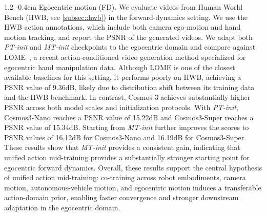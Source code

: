 \documentclass{llmxive}
\makeatletter
\providecommand{\paragraph}{  \@startsection{paragraph}{4}{\z@}    {1\baselineskip \@plus .2\baselineskip}    {-0.4em}    {\normalfont\normalsize\bfseries}}
\makeatother
\begin{document}
\paragraph{Egocentric motion (FD).}
\label{sec:egocentric_fdm}
We evaluate videos from Human World Bench (HWB, see \cref{subsec::hwb}) in the forward-dynamics
setting. We use the HWB action annotations, which include both camera ego-motion and hand motion tracking, and report the PSNR of the generated
videos. We adapt both \textit{PT-init} and \textit{MT-init} checkpoints to the egocentric domain and compare against LOME~\citep{gao2026lome}, a recent action-conditioned video generation method specialized for egocentric hand manipulation data. 
Although LOME is one of the closest available baselines for this setting, it performs poorly on HWB, achieving a PSNR value of 9.36dB, likely due to distribution shift between its training data and the HWB benchmark.
In contrast, Cosmos 3 achieves substantially higher PSNR across both model scales and initialization protocols. With \textit{PT-init},
Cosmos3-Nano reaches a PSNR value of 15.22dB and Cosmos3-Super reaches a PSNR value of 15.34dB. 
Starting from \textit{MT-init}
further improves the scores to PSNR values of 16.12dB for Cosmos3-Nano and 16.19dB for Cosmos3-Super. 
These results show that \textit{MT-init} provides a consistent gain, indicating that unified action mid-training
provides a substantially stronger starting point for egocentric forward dynamics.
Overall, these results support the central hypothesis of unified action mid-training: co-training across robot embodiments, camera
motion, autonomous-vehicle motion, and egocentric motion induces a transferable action-domain prior, enabling faster convergence and
stronger downstream adaptation in the egocentric domain.
\end{document}
